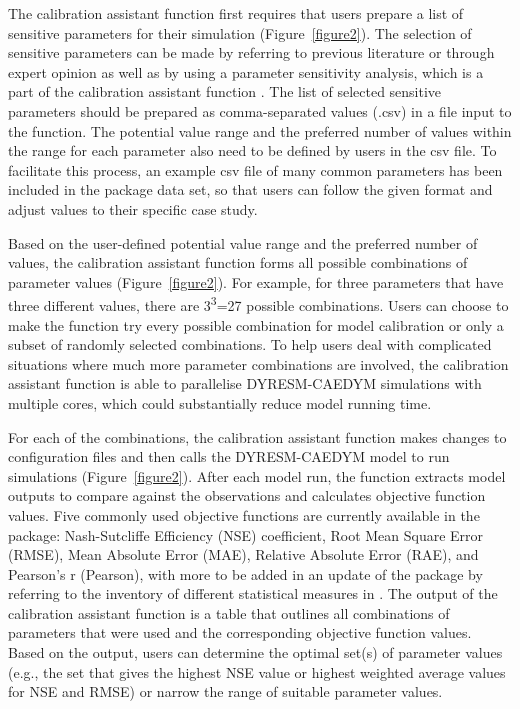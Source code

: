 The calibration assistant function first requires that users prepare a list of sensitive parameters for their simulation (Figure~\ref{figure2}). The selection of sensitive parameters can be made by referring to previous literature \citep{bruce2006numerical,robson2004three,schladow1997prediction} or through expert opinion \citep{lehmann2018modelling} as well as by using a parameter sensitivity analysis, which is a part of the calibration assistant function \citep{ofir2017predicting}. The list of selected sensitive parameters should be prepared as comma-separated values (.csv) in a file input to the function. The potential value range and the preferred number of values within the range for each parameter also need to be defined by users in the csv file. To facilitate this process, an example csv file of many common parameters has been included in the package data set, so that users can follow the given format and adjust values to their specific case study.\par

Based on the user-defined potential value range and the preferred number of values, the calibration assistant function forms all possible combinations of parameter values (Figure~\ref{figure2}). For example, for three parameters that have three different values, there are 3\textsuperscript{3}=27 possible combinations. Users can choose to make the function try every possible combination for model calibration or only a subset of randomly selected combinations. To help users deal with complicated situations where much more parameter combinations are involved, the calibration assistant function is able to parallelise DYRESM-CAEDYM simulations with multiple cores, which could substantially reduce model running time.\par

For each of the combinations, the calibration assistant function makes changes to configuration files and then calls the DYRESM-CAEDYM model to run simulations (Figure~\ref{figure2}). After each model run, the function extracts model outputs to compare against the observations and calculates objective function values. Five commonly used objective functions are currently available in the package: Nash-Sutcliffe Efficiency (NSE) coefficient, Root Mean Square Error (RMSE), Mean Absolute Error (MAE), Relative Absolute Error (RAE), and Pearson’s r (Pearson), with more to be added in an update of the package by referring to the inventory of different statistical measures in \citet{bennett2013characterising}. The output of the calibration assistant function is a table that outlines all combinations of parameters that were used and the corresponding objective function values. Based on the output, users can determine the optimal set(s) of parameter values (e.g., the set that gives the highest NSE value or highest weighted average values for NSE and RMSE) or narrow the range of suitable parameter values.\par

